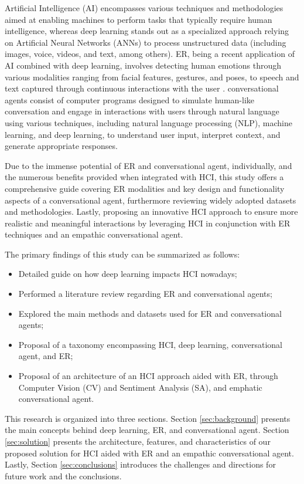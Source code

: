 \documentclass[runningheads]{llncs}
\begin{document}
Artificial Intelligence (AI) encompasses various techniques and methodologies aimed at enabling machines to perform tasks that typically require human intelligence, whereas deep learning stands out as a specialized approach relying on Artificial Neural Networks (ANNs) to process unstructured data (including images, voice, videos, and text, among others). ER, being a recent application of AI combined with deep learning, involves detecting human emotions through various modalities ranging from facial features, gestures, and poses, to speech and text captured through continuous interactions with the user \cite{alrowais_modified_2023}.  conversational agents consist of computer programs designed to simulate human-like conversation and engage in interactions with users through natural language using various techniques, including natural language processing (NLP), machine learning, and deep learning, to understand user input, interpret context, and generate appropriate responses.
 
Due to the immense potential of ER and conversational agent, individually, and the numerous benefits provided when integrated with HCI, this study offers a comprehensive guide covering ER modalities and key design and functionality aspects of a conversational agent, furthermore reviewing widely adopted datasets and methodologies. Lastly, proposing an innovative HCI approach to ensure more realistic and meaningful interactions by leveraging HCI in conjunction with ER techniques and an empathic conversational agent.
 
The primary findings of this study can be summarized as follows:
\begin{itemize}
	\item Detailed guide on how deep learning impacts HCI nowadays;
	\item Performed a literature review regarding ER and conversational agents;
	\item Explored the main methods and datasets used for ER and conversational agents;
	\item Proposal of a taxonomy encompassing HCI, deep learning, conversational agent, and ER;
	\item Proposal of an architecture of an HCI approach aided with ER, through Computer Vision (CV) and Sentiment Analysis (SA), and emphatic conversational agent.
\end{itemize}

This research is organized into three sections. Section \ref{sec:background} presents the main concepts behind deep learning, ER, and conversational agent. Section \ref{sec:solution} presents the architecture, features, and characteristics of our proposed solution for HCI aided with ER and an empathic conversational agent. Lastly, Section \ref{sec:conclusions}  introduces the challenges and directions for future work and the conclusions. 
\end{document}
